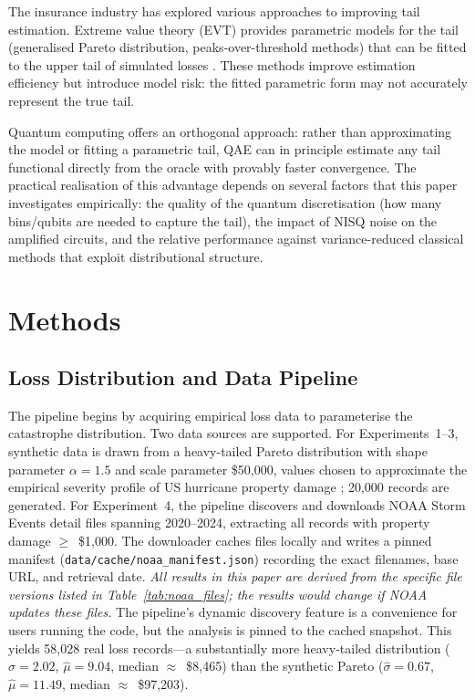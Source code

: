 \documentclass[11pt,a4paper]{article}
\begin{document}
The insurance industry has explored various approaches to improving tail estimation. Extreme value theory (EVT) provides parametric models for the tail (generalised Pareto distribution, peaks-over-threshold methods) that can be fitted to the upper tail of simulated losses \cite{Embrechts1997}. These methods improve estimation efficiency but introduce model risk: the fitted parametric form may not accurately represent the true tail.

Quantum computing offers an orthogonal approach: rather than approximating the model or fitting a parametric tail, QAE can in principle estimate any tail functional directly from the oracle with provably faster convergence. The practical realisation of this advantage depends on several factors that this paper investigates empirically: the quality of the quantum discretisation (how many bins/qubits are needed to capture the tail), the impact of NISQ noise on the amplified circuits, and the relative performance against variance-reduced classical methods that exploit distributional structure.


\section{Methods}
\label{sec:methods}

\subsection{Loss Distribution and Data Pipeline}

The pipeline begins by acquiring empirical loss data to parameterise the catastrophe distribution. Two data sources are supported. For Experiments~1--3, synthetic data is drawn from a heavy-tailed Pareto distribution with shape parameter $\alpha = 1.5$ and scale parameter \$50,000, values chosen to approximate the empirical severity profile of US hurricane property damage \cite{Grossi2005}; 20,000 records are generated. For Experiment~4, the pipeline discovers and downloads NOAA Storm Events detail files \cite{NOAA2024} spanning 2020--2024, extracting all records with property damage $\geq$~\$1,000. The downloader caches files locally and writes a pinned manifest (\texttt{data/cache/noaa\_manifest.json}) recording the exact filenames, base URL, and retrieval date. \emph{All results in this paper are derived from the specific file versions listed in Table~\ref{tab:noaa_files}; the results would change if NOAA updates these files.} The pipeline's dynamic discovery feature is a convenience for users running the code, but the analysis is pinned to the cached snapshot. This yields 58,028 real loss records---a substantially more heavy-tailed distribution ($\hat{\sigma} = 2.02$, $\hat{\mu} = 9.04$, median $\approx$~\$8,465) than the synthetic Pareto ($\hat{\sigma} = 0.67$, $\hat{\mu} = 11.49$, median $\approx$~\$97,203).
\end{document}
